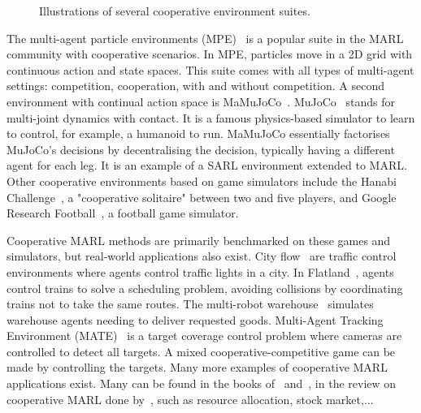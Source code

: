 \begin{figure}
    \centering
    
    \caption{Illustrations of several cooperative environment suites.}
    \label{fig:ch3_envs}
\end{figure}


The multi-agent particle environments (MPE)~\citep{lowe2017multi} is a popular suite in the MARL community with cooperative scenarios.
In MPE, particles move in a 2D grid with continuous action and state spaces.
This suite comes with all types of multi-agent settings: competition, cooperation, with and without competition.
A second environment with continual action space is MaMuJoCo~\citep{peng2021facmac}.
MuJoCo~\citep{todorov2012mujoco} stands for multi-joint dynamics with contact.
It is a famous physics-based simulator to learn to control, for example, a humanoid to run.
MaMuJoCo essentially factorises MuJoCo's decisions by decentralising the decision, typically having a different agent for each leg.
It is an example of a SARL environment extended to MARL.
Other cooperative environments based on game simulators include the Hanabi Challenge~\citep{Bard_2020}, a "cooperative solitaire" between two and five players, and Google Research Football~\citep{kurach2020google}, a football game simulator.

Cooperative MARL methods are primarily benchmarked on these games and simulators, but real-world applications also exist.
City flow~\citep{zhang2019cityflow} are traffic control environments where agents control traffic lights in a city.
In Flatland~\citep{mohanty2020flatland}, agents control trains to solve a scheduling problem, avoiding collisions by coordinating trains not to take the same routes.
The multi-robot warehouse~\citep{papoudakis2021benchmarking, christianos2020shared} simulates warehouse agents needing to deliver requested goods.
Multi-Agent Tracking Environment (MATE)~\citep{NEURIPS2022_b2a1c152} is a target coverage control problem where cameras are controlled to detect all targets.
A mixed cooperative-competitive game can be made by controlling the targets.
Many more examples of cooperative MARL applications exist.
Many can be found in the books of~\cite{DecPomdp} and~\cite{marl-book}, in the review on cooperative MARL done by~\cite{oroojlooy2022review}, such as resource allocation, stock market,...


